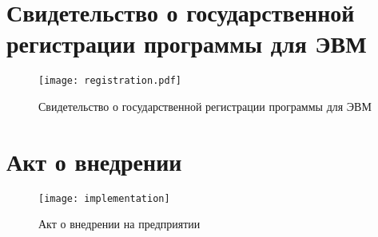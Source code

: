 \chapter{Свидетельство о государственной регистрации программы для ЭВМ}\label{app:sec:registration}
\begin{center}
    \begin{figure}[hb]
        \texttt{[image: registration.pdf]}
        \caption{Свидетельство о государственной регистрации программы для ЭВМ}\label{app:fig:registration}
    \end{figure}
\end{center}



\chapter{Акт о внедрении}\label{app:sec:implementation}
\begin{center}
    \begin{figure}[hb]
        \texttt{[image: implementation]}
        \caption{Акт о внедрении на предприятии \leadingOrganizationTitle}\label{app:fig:implementation}
    \end{figure}
\end{center}